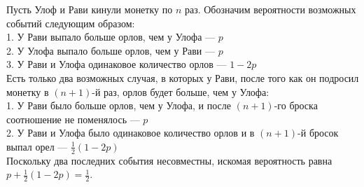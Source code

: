 \documentclass{article}
\begin{document}
Пусть Улоф и Рави кинули монетку по $n$ раз. Обозначим вероятности возможных событий следующим образом:\\
1. У Рави выпало больше орлов, чем у Улофа --- $p$\\
2. У Улофа выпало больше орлов, чем у Рави --- $p$\\
3. У Рави и Улофа одинаковое количество орлов --- $1-2p$\\
Есть только два возможных случая, в которых у Рави, после того как он подросил монетку в $(n+1)$-й раз, орлов будет больше, чем у Улофа:\\
1. У Рави было больше орлов, чем у Улофа, и после $(n+1)$-го броска соотношение не поменялось --- $p$\\
2. У Рави и Улофа было одинаковое количество орлов и в $(n+1)$-й бросок выпал орел --- $\frac12 (1-2p)$\\
Поскольку два последних события несовместны, искомая вероятность равна $p + \frac12 (1-2p) = \frac12$.
\end{document}

